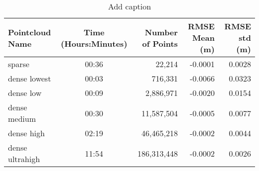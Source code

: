\begin{table}[htbp]
  \centering
  \caption{Add caption}
    \begin{tabular}{lcrrr}
   	\toprule
    Pointcloud Name & Time (Hours:Minutes) & Number of Points & RMSE Mean (m) & RMSE std (m)\\
    \midrule
    sparse          & 00:36 & 22,214       & -0.0001  & 0.0028 \\
    dense lowest    & 00:03 & 716,331      & -0.0066  & 0.0323 \\
    dense low       & 00:09 & 2,886,971    & -0.0020  & 0.0154 \\
    dense medium    & 00:30 & 11,587,504   & -0.0005  & 0.0077 \\
    dense high      & 02:19 & 46,465,218   & -0.0002  & 0.0044 \\
    dense ultrahigh & 11:54 & 186,313,448 & -0.0002  & 0.0026 \\
    \bottomrule
    \end{tabular}%
  \label{tab:pctime}%
\end{table}%
